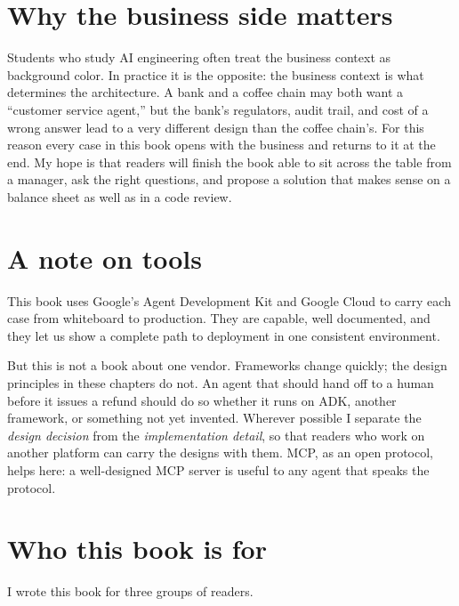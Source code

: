 
\section*{Why the business side matters}

Students who study AI engineering often treat the business context as
background color. In practice it is the opposite: the business context is what
determines the architecture. A bank and a coffee chain may both want a
``customer service agent,'' but the bank's regulators, audit trail, and cost of
a wrong answer lead to a very different design than the coffee chain's. For this
reason every case in this book opens with the business and returns to it at the
end. My hope is that readers will finish the book able to sit across the table
from a manager, ask the right questions, and propose a solution that makes sense
on a balance sheet as well as in a code review.

\section*{A note on tools}

This book uses Google's Agent Development Kit and Google Cloud to carry each case
from whiteboard to production. They are capable, well documented, and they let
us show a complete path to deployment in one consistent environment.

But this is not a book about one vendor. Frameworks change quickly; the design
principles in these chapters do not. An agent that should hand off to a human
before it issues a refund should do so whether it runs on ADK, another
framework, or something not yet invented. Wherever possible I separate the
\emph{design decision} from the \emph{implementation detail}, so that readers
who work on another platform can carry the designs with them. MCP, as an open
protocol, helps here: a well-designed MCP server is useful to any agent that
speaks the protocol.

\section*{Who this book is for}

I wrote this book for three groups of readers.

